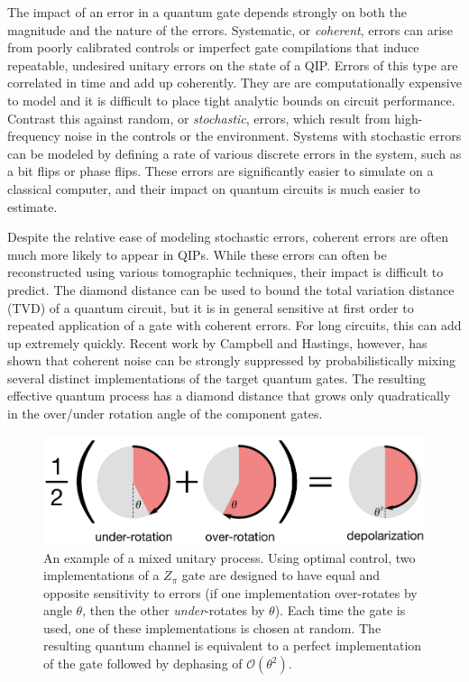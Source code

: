 \documentclass[aps,nofootinbib,pra,notitlepage,twocolumn]{revtex4-1}
\newcommand{\order}[1]{\mathcal{O}\left( #1 \right)}
\begin{document}
The impact of an error in a quantum gate depends strongly on both the magnitude and the nature of the errors. Systematic, or \emph{coherent}, errors can arise from poorly calibrated controls or imperfect gate compilations that induce repeatable, undesired unitary errors on the state of a QIP. Errors of this type are correlated in time and add up coherently. They are are  computationally expensive to model and it is difficult to place tight analytic bounds on circuit performance. Contrast this against random, or \emph{stochastic}, errors, which result from high-frequency noise in the controls or the environment. Systems with stochastic errors can be  modeled by defining a rate of various discrete errors in the system, such as a bit flips or phase flips. These errors are significantly easier to simulate on a classical computer, and their impact on quantum circuits is much easier to estimate.

Despite the relative ease of modeling stochastic errors, coherent errors are often much more likely to appear in QIPs. While these errors can often be reconstructed using various tomographic techniques, their impact is difficult to predict. The diamond distance can be used to bound the total variation distance (TVD) of a quantum circuit, but it is in general sensitive at first order to repeated application of a gate with coherent errors. For long circuits, this can add up extremely quickly. Recent work by Campbell and Hastings\cite{Campbell2017, 1612.01011, 1811.08017}, however, has shown that coherent noise can be strongly suppressed by probabilistically mixing several distinct implementations of the target quantum gates. The resulting effective quantum process has a diamond distance that grows only quadratically in the over/under rotation angle of the component gates.

\begin{figure}[t]
  \centering
  \includegraphics[width=\columnwidth]{simple_example.pdf}
  \caption{An example of a mixed unitary process. Using optimal control, two implementations of a $Z_\pi$ gate are designed to have equal and opposite sensitivity to errors (if one implementation over-rotates by angle $\theta$, then the other \emph{under}-rotates by $\theta$). Each time the gate is used, one of these implementations is chosen at random. The resulting quantum channel is equivalent to a perfect implementation of the gate followed by dephasing of $\order{\theta^2}$.}
  \label{fig:simple_example}
\end{figure}
\end{document}
